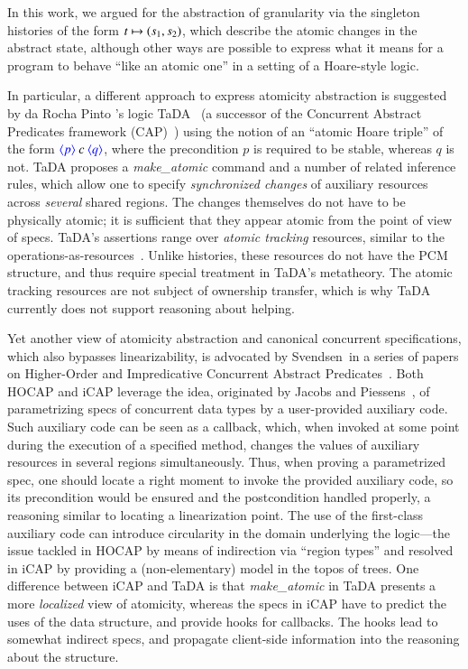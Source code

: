 In this work, we argued for the abstraction of granularity via the
singleton histories of the form $t \mapsto (s_1, s_2)$, which describe
the atomic changes in the abstract state, although other ways are
possible to express what it means for a program to behave ``like an
atomic one'' in a setting of a Hoare-style logic.

In particular, a different approach to express atomicity abstraction
is suggested by da Rocha Pinto \etal's logic
TaDA~\cite{ArrozPincho-al:ECOOP14} (a successor of the Concurrent
Abstract Predicates framework (CAP)~\cite{DinsdaleYoung-al:ECOOP10})
using the notion of an ``atomic Hoare triple'' of the form
$\textcolor{blue}{\langle{p}\rangle}~c~\textcolor{blue}{\langle{q}\rangle}$, where the precondition $p$ is required to
be stable, whereas $q$ is not.
% 
TaDA proposes a \emph{make\_atomic} command and a number of related
inference rules, which allow one to specify \emph{synchronized
  changes} of auxiliary resources across \emph{several} shared
regions. The changes themselves do not have to be physically atomic;
it is sufficient that they appear atomic from the point of view of
specs. TaDA's assertions range over \emph{atomic tracking} resources,
similar to the
operations-as-resources~\cite{Liang-Feng:PLDI13,Turon-al:ICFP13}. Unlike
histories, these resources do not have the PCM structure, and thus
require special treatment in TaDA's metatheory. The atomic tracking
resources are not subject of ownership transfer, which is why TaDA
currently does not support reasoning about helping.

Yet another view of atomicity abstraction and canonical concurrent
specifications, which also bypasses linearizability, is advocated by
Svendsen~\etal in a series of papers on Higher-Order and Impredicative
Concurrent Abstract
Predicates~\cite{Svendsen-al:ESOP13,Svendsen-Birkedal:ESOP14}.
%
Both HOCAP and iCAP leverage the idea, originated by Jacobs and
Piessens~\cite{Jacobs-Piessens:POPL11}, of parametrizing specs of
concurrent data types by a user-provided auxiliary code.
%
Such auxiliary code can be seen as a callback, which, when invoked at
some point during the execution of a specified method, changes the
values of auxiliary resources in several regions simultaneously.
%
Thus, when proving a parametrized spec, one should locate a right
moment to invoke the provided auxiliary code, so its precondition
would be ensured and the postcondition handled properly, a reasoning
similar to locating a linearization point.
%
The use of the first-class auxiliary code can introduce circularity in
the domain underlying the logic---the issue tackled in HOCAP by means
of indirection via ``region types'' and resolved in iCAP by providing
a (non-elementary) model in the topos of trees.
%
One difference between iCAP and TaDA is that \emph{make\_atomic} in
TaDA presents a more \emph{localized} view of atomicity, whereas the
specs in iCAP have to predict the uses of the data structure, and
provide hooks for callbacks. The hooks lead to somewhat indirect
specs, and propagate client-side information into the reasoning about
the structure.

